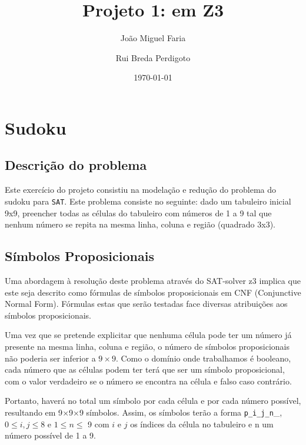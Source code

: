 \documentclass[a4paper,12pt]{article}
\title{Projeto 1: \sat em {Z3}}
\author{João Miguel Faria \and Rui Breda Perdigoto}
\date{\today}
\newcommand{\sat}{\texttt{SAT}\xspace}
\begin{document}
\maketitle

\section{Sudoku}

\subsection{Descrição do problema}
Este exercício do projeto consistiu na modelação e redução do problema do
sudoku para \sat. Este problema consiste no seguinte: dado um tabuleiro inicial
9x9, preencher todas as células do tabuleiro com números de 1 a 9 tal que
nenhum número se repita na mesma linha, coluna e região (quadrado 3x3).

\subsection{Símbolos Proposicionais}
Uma abordagem à resolução deste problema através do SAT-solver z3 implica que
este seja descrito como fórmulas de símbolos proposicionais em CNF (Conjunctive
Normal Form). Fórmulas estas que serão testadas face diversas atribuições aos
símbolos proposicionais.

Uma vez que se pretende explicitar que nenhuma célula pode ter um número já
presente na mesma linha, coluna e região, o número de símbolos proposicionais
não poderia ser inferior a $9\times9$. Como o domínio onde trabalhamos é
booleano, cada número que as células podem ter terá que ser um símbolo
proposicional, com o valor verdadeiro se o número se encontra na célula e falso
caso contrário.
 
Portanto, haverá no total um símbolo por cada célula e por cada número
possível, resultando em 9$\times$9$\times$9 símbolos. Assim, os símbolos terão
a forma \texttt{p\_i\_j\_n}\_, $0\leq i, j \leq 8$
e $1 \leq n \leq$ 9 com $i$ e $j$ os índices da célula no tabuleiro e n um
número possível de 1 a 9.
\end{document}

